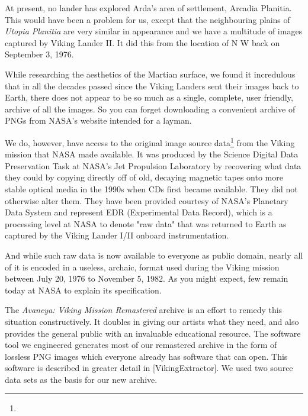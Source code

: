 At present, no lander has explored Arda's area of settlement, Arcadia Planitia. This would have been a problem for us, except that the neighbouring plains of {\it Utopia Planitia} are very similar in appearance and we have a multitude of images captured by Viking Lander II. It did this from the location of N W back on September 3, 1976.

    {}


While researching the aesthetics of the Martian surface, we found it incredulous that in all the decades passed since the Viking Landers sent their images back to Earth, there does not appear to be so much as a single, complete, user friendly, archive of all the images. So you can forget downloading a convenient archive of PNGs from NASA's website intended for a layman.

We do, however, have access to the original image source data\footnote{} from the Viking mission that NASA made available. It was produced by the Science Digital Data Preservation Task at NASA's Jet Propulsion Laboratory by recovering what data they could by copying directly off of old, decaying magnetic tapes onto more stable optical media in the 1990s when CDs first became available. They did not otherwise alter them. They have been provided courtesy of NASA's Planetary Data System and represent EDR (Experimental Data Record), which is a processing level at NASA to denote "raw data" that was returned to Earth as captured by the Viking Lander I/II onboard instrumentation.

And while such raw data is now available to everyone as public domain, nearly all of it is encoded in a useless, archaic, format used during the Viking mission between July 20, 1976 to November 5, 1982. As you might expect, few remain today at NASA to explain its specification.

The {\it Avaneya: Viking Mission Remastered} archive is an effort to remedy this situation constructively. It doubles in giving our artists what they need, and also provides the general public with an invaluable educational resource. The software tool we engineered generates most of our remastered archive in the form of lossless PNG images which everyone already has software that can open. This software is described in greater detail in [VikingExtractor]. We used two source data sets as the basis for our new archive.

